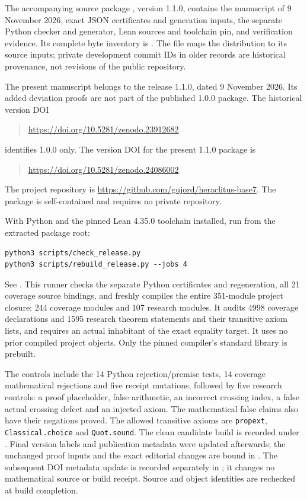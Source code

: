 \documentclass[11pt,a4paper]{article}
\begin{document}
The accompanying source package \cite{package}, version 1.1.0, contains the
manuscript of 9 November 2026,
exact JSON certificates and generation inputs, the separate Python checker
and generator, Lean sources and toolchain pin, and verification evidence.
Its complete byte inventory is . The file
 maps the distribution to its source inputs;
private development commit IDs in older records are historical provenance,
not revisions of the public repository.

The present manuscript belongs to the release 1.1.0,
dated 9 November 2026. Its added deviation proofs are not part of the
published 1.0.0 package. The historical version DOI
\begin{quote}\small
\mbox{\url{https://doi.org/10.5281/zenodo.23912682}}
\end{quote}
identifies 1.0.0 only. The version DOI for the present 1.1.0 package is
\begin{quote}\small
\mbox{\url{https://doi.org/10.5281/zenodo.24086002}}
\end{quote}
The project repository is \url{https://github.com/gujord/heraclitus-base7}.
The package is self-contained and requires no private repository.

With Python and the pinned Lean 4.35.0 toolchain installed, run from the
extracted package root:
\begin{verbatim}
python3 scripts/check_release.py
python3 scripts/rebuild_release.py --jobs 4
\end{verbatim}
See . This runner checks the separate Python
certificates and regeneration, all 21 coverage source bindings, and freshly
compiles the entire 351-module project closure: 244 coverage modules and
107 research modules. It audits 4998 coverage declarations and 1595 research
theorem statements and their transitive axiom lists, and requires an actual
inhabitant of the exact equality target. It uses no prior compiled project
objects. Only the pinned compiler's standard library is prebuilt.

The controls include the 14 Python rejection/premise tests, 14 coverage
mathematical rejections and five receipt mutations, followed by five research
controls: a proof placeholder, false arithmetic, an incorrect crossing index,
a false actual crossing defect and an injected axiom. The mathematical false
claims also have their negations proved. The allowed transitive axioms are
\texttt{propext}, \texttt{Classical.choice} and \texttt{Quot.sound}.
The clean candidate build is recorded under
. Final version labels and publication metadata
were updated afterwards; the unchanged proof inputs and the exact editorial
changes are bound in . The subsequent
DOI metadata update is recorded separately in ;
it changes no mathematical source or build receipt.
Source and object identities are rechecked at build completion.
\end{document}
